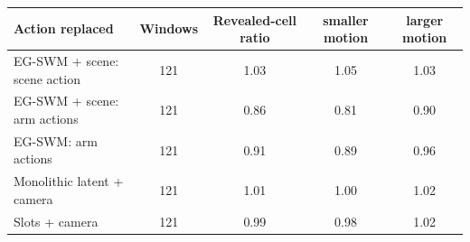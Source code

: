 \begin{tabular}{lcccc}
\toprule
Action replaced & Windows & Revealed-cell ratio & smaller motion & larger motion \\
\midrule
EG-SWM + scene: scene action & 121 & 1.03 & 1.05 & 1.03 \\
EG-SWM + scene: arm actions & 121 & 0.86 & 0.81 & 0.90 \\
EG-SWM: arm actions & 121 & 0.91 & 0.89 & 0.96 \\
Monolithic latent + camera & 121 & 1.01 & 1.00 & 1.02 \\
Slots + camera & 121 & 0.99 & 0.98 & 1.02 \\
\bottomrule
\end{tabular}
